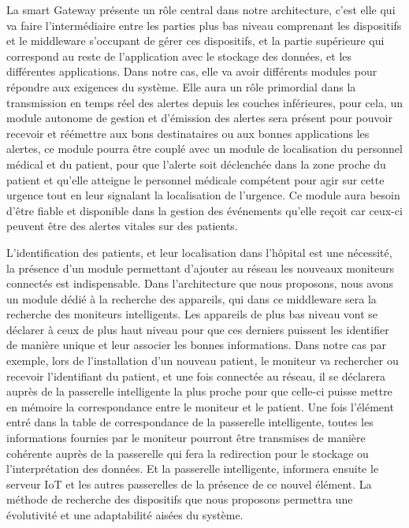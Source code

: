 La smart Gateway présente un rôle central dans notre architecture, c’est elle qui va faire l’intermédiaire entre les parties plus bas niveau comprenant les dispositifs et le middleware s’occupant de gérer ces dispositifs, et la partie supérieure qui correspond au reste de l’application avec le stockage des données, et les différentes applications.
Dans notre cas, elle va avoir différents modules pour répondre aux exigences du système. Elle aura un rôle primordial dans la transmission en temps réel des alertes depuis les couches inférieures, pour cela, un module autonome de gestion et d’émission des alertes sera présent pour pouvoir recevoir et réémettre aux bons destinataires ou aux bonnes applications les alertes, ce module pourra être couplé avec un module de localisation du personnel médical et du patient, pour que l’alerte soit déclenchée dans la zone proche du patient et qu’elle atteigne le personnel médicale compétent pour agir sur cette urgence tout en leur signalant la localisation de l’urgence. Ce module aura besoin d’être fiable et disponible dans la gestion des événements qu’elle reçoit car ceux-ci peuvent être des alertes vitales sur des patients.

L’identification des patients, et leur localisation dans l’hôpital est une nécessité, la présence d’un module permettant d’ajouter au réseau les nouveaux moniteurs connectés est indispensable. Dans l’architecture que nous proposons, nous avons un module dédié à la recherche des appareils, qui dans ce middleware sera la recherche des moniteurs intelligents. Les appareils de plus bas niveau vont se déclarer à ceux de plus haut niveau pour que ces derniers puissent les identifier de manière unique et leur associer les bonnes informations. Dans notre cas par exemple, lors de l’installation d’un nouveau patient, le moniteur va rechercher ou recevoir l’identifiant du patient, et une fois connectée au réseau, il se déclarera auprès de la passerelle intelligente la plus proche pour que celle-ci puisse mettre en mémoire la correspondance entre le moniteur et le patient. Une fois l’élément entré dans la table de correspondance de la passerelle intelligente, toutes les informations fournies par le moniteur pourront être transmises de manière cohérente auprès de la passerelle qui fera la redirection pour le stockage ou l’interprétation des données. Et la passerelle intelligente, informera ensuite le serveur IoT et les autres passerelles de la présence de ce nouvel élément. La méthode de recherche des dispositifs que nous proposons permettra une évolutivité et une adaptabilité aisées du système.

